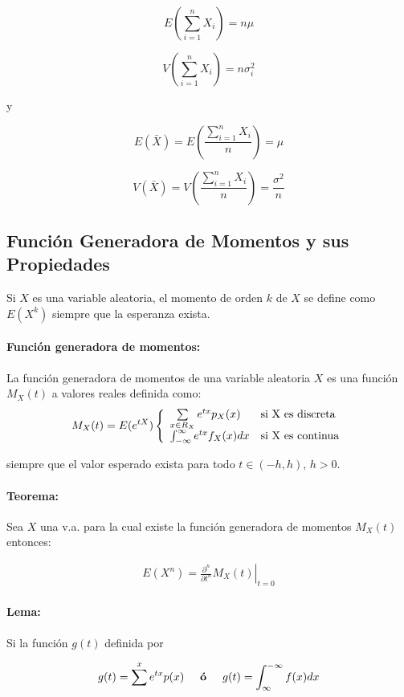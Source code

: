 $$E\left(\sum_{i=1}^{n} X_i\right) = n\mu$$

$$V\left(\sum_{i=1}^{n} X_i\right) = n\sigma^2_i$$

y

$$E(\bar{X}) = E\left(\frac{\sum_{i=1}^{n} X_i}{n}\right) = \mu$$

$$V(\bar{X}) = V\left(\frac{\sum_{i=1}^{n} X_i}{n}\right) = \frac{\sigma^2}{n}$$


\subsection{Función Generadora de Momentos y sus Propiedades}
Si $X$ es una variable aleatoria, el momento de orden $k$ de $X$ se define como $E(X^k)$ siempre que la esperanza exista.

\paragraph{Función generadora de momentos:} La función generadora de momentos de una variable aleatoria $X$ es una función $M_X(t)$ a valores reales definida como:
\begin{align*}
M_X(t) = E(e^{tX})\left\{
\begin{array}{ll}
\sum\limits_{x\in R_X} e^{tx}p_X(x) & \text{si } $X$ \text{ es discreta}\\
\int_{-\infty}^{\infty} e^{tx}f_X(x)dx & \text{si } $X$ \text{ es continua}\\
\end{array}
\right.
\end{align*}

siempre que el valor esperado exista para todo $t \in (-h,h)$, $h > 0$.

\paragraph{Teorema:} Sea $X$ una v.a. para la cual existe la función generadora de momentos $M_X(t)$ entonces:

\begin{align*}
	E(X^n) =  \left.\frac{\partial^{n}}{\partial t^{n}} M_X(t)
		\right|_{t=0}
\end{align*}

\paragraph{Lema:} Si la función $g(t)$ definida por

\begin{align*}
	g(t) = \sum_{}^{x} e^{tx}p(x)\hspace{5mm}\textbf{ó}\hspace{5mm}g(t) = \int_{\infty}^{-\infty} f(x)dx
\end{align*}

